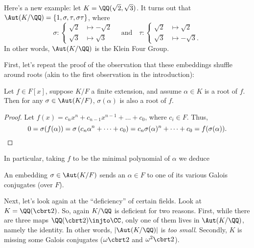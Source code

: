 \begin{example}
	Here's a new example: let $K = \QQ(\sqrt2, \sqrt3)$.
	It turns out that $\Aut(K/\QQ) = \{1, \sigma, \tau, \sigma\tau\}$, where
	\[
		\sigma :
		\begin{cases}
			\sqrt2 &\mapsto -\sqrt2 \\
			\sqrt3 &\mapsto \sqrt3
		\end{cases}
		\quad\text{and}\quad
		\tau :
		\begin{cases}
			\sqrt2 &\mapsto \sqrt2 \\
			\sqrt3 &\mapsto -\sqrt3.
		\end{cases}
	\]
	In other words, $\Aut(K/\QQ)$ is the Klein Four Group.
\end{example}

First, let's repeat the proof of the observation that these embeddings shuffle around roots
(akin to the first observation in the introduction):
\begin{lemma}
	Let $f \in F[x]$, suppose $K/F$ a finite extension, and assume $\alpha \in K$ is a root of $f$.
	Then for any $\sigma \in \Aut(K/F)$, $\sigma(\alpha)$ is also a root of $f$.
	\label{lem:root_shuffle}
\end{lemma}
\begin{proof}
	Let $f(x) = c_nx^n + c_{n-1}x^{n-1} + \dots + c_0$, where $c_i \in F$.
	Thus,
	\[ 0 = \sigma(f(\alpha)) = \sigma\left( c_n\alpha^n + \dots + c_0 \right)
	= c_n\sigma(\alpha)^n + \dots + c_0 = f(\sigma(\alpha)). \qedhere \]
\end{proof}
In particular, taking $f$ to be the minimal polynomial of $\alpha$ we deduce
\begin{moral}
	An embedding $\sigma \in \Aut(K/F)$ sends an $\alpha \in F$
	to one of its various Galois conjugates (over $F$).
\end{moral}

Next, let's look again at the ``deficiency'' of certain fields.
Look at $K = \QQ(\cbrt 2)$.
So, again $K / \QQ$ is deficient for two reasons.
First, while there are three maps $\QQ(\cbrt 2) \injto \CC$,
only one of them lives in $\Aut(K/\QQ)$, namely the identity.
In other words, $\left\lvert \Aut(K/\QQ) \right\rvert$ is \emph{too small}.
Secondly, $K$ is missing some Galois conjugates ($\omega \cbrt 2$ and $\omega^2 \cbrt 2$).

